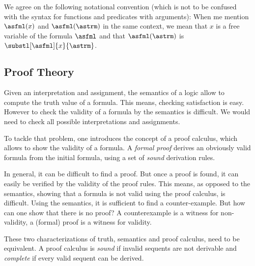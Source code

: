             We agree on the following notational convention
            (which is not to be confused with the syntax for functions and predicates with arguments):
            When me mention $\asfml(x)$ and $\asfml(\astrm)$ in the same context, we mean that $x$ is a free variable of the formula $\asfml$ and that $\asfml(\astrm)$ is $\substl[\asfml]{x}{\astrm}$.

        \subsection{Proof Theory}
            \label{sec:FOL-proof-theory}

            
            Given an interpretation and assignment, the semantics of a logic allow to compute the truth value of a formula. This means, checking satisfaction is easy.
            However to check the validity of a formula by the semantics is difficult. We would need to check all possible interpretations and assignments.

            To tackle that problem, one introduces the concept of a proof calculus, which allows to show the validity of a formula.
            A \emph{formal proof} derives an obviously valid formula from the initial formula, using a set of \emph{sound} derivation rules.

            In general, it can be difficult to find a proof.
            But once a proof is found, it can easily be verified by the validity of the proof rules.
            This means, as opposed to the semantics, showing that a formula is not valid using the proof calculus, is difficult.
            Using the semantics, it is sufficient to find a counter-example. But how can one show that there is no proof?
            A counterexample is a witness for non-validity, a (formal) proof is a witness for validity. 




            These two characterizations of truth, semantics and proof calculus, need to be equivalent.
            A proof calculus is \emph{sound} if invalid sequents are not derivable and \emph{complete} if every valid sequent can be derived.

